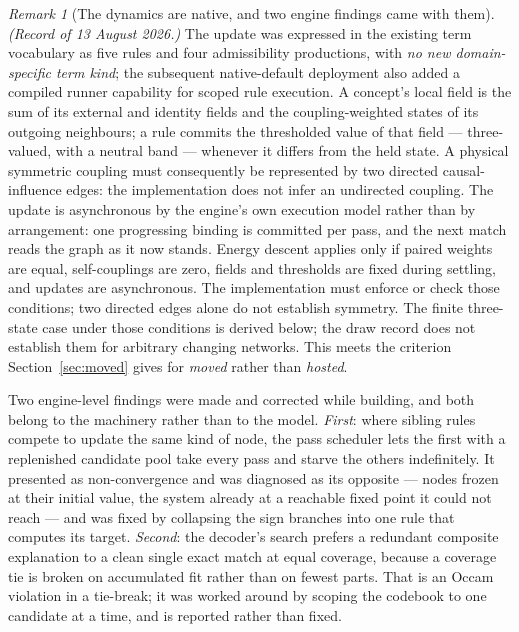 \documentclass[11pt,a4paper]{article}
\theoremstyle{remark}
\newtheorem{remark}[definition]{Remark}
\begin{document}
\begin{remark}[The dynamics are native, and two engine findings came with them]\label{rem:native}
\emph{(Record of 13 August 2026.)} The update was expressed in the existing term vocabulary as
five rules and four admissibility productions, with \emph{no new domain-specific term kind}; the
subsequent native-default deployment also added a compiled runner capability for scoped rule
execution. A concept's local field is the sum of its external and identity fields and the
coupling-weighted states of its outgoing neighbours; a rule commits the thresholded value of that
field --- three-valued, with a neutral band --- whenever it differs from the held state. A physical
symmetric coupling must consequently be represented by two directed causal-influence edges: the
implementation does not infer an undirected coupling. The update is asynchronous by the engine's own
execution model rather than by arrangement: one progressing binding is committed per pass, and the
next match reads the graph as it now stands. Energy descent applies only if paired weights are equal, self-couplings are zero, fields and thresholds are fixed during settling, and updates are asynchronous. The implementation must enforce or check those conditions; two directed edges alone do not establish symmetry. The finite three-state case under those conditions is derived below; the draw record does not establish them for arbitrary changing networks. This meets the criterion
Section~\ref{sec:moved} gives for \emph{moved} rather than \emph{hosted}.

Two engine-level findings were made and corrected while building, and both belong to the machinery
rather than to the model. \emph{First}: where sibling rules compete to update the same kind of node,
the pass scheduler lets the first with a replenished candidate pool take every pass and starve the
others indefinitely. It presented as non-convergence and was diagnosed as its opposite --- nodes
frozen at their initial value, the system already at a reachable fixed point it could not reach ---
and was fixed by collapsing the sign branches into one rule that computes its target. \emph{Second}:
the decoder's search prefers a redundant composite explanation to a clean single exact match at equal
coverage, because a coverage tie is broken on accumulated fit rather than on fewest parts. That is an
Occam violation in a tie-break; it was worked around by scoping the codebook to one candidate at a
time, and is reported rather than fixed.
\end{remark}
\end{document}
